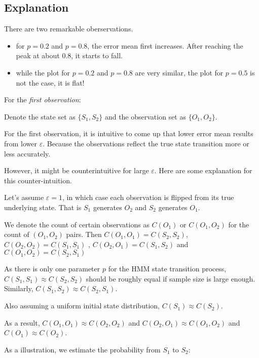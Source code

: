 \documentclass[paper=a4, fontsize=11pt]{scrartcl} %
\numberwithin{equation}{section} %
\numberwithin{figure}{section} %
\numberwithin{table}{section} %
\begin{document}
\subsection {Explanation}

There are two remarkable oberservations.

\begin{itemize}
\item for $p=0.2$ and $p=0.8$, the error mean first increases. After reaching the peak at about 0.8, it starts to fall.
\item while the plot for $p=0.2$ and $p=0.8$ are very similar, the plot for $p=0.5$ is not the case, it is flat!
\end {itemize}

For the {\em first observation}:\newline

Denote the state set as $\{S_1, S_2\}$ and the observation set as $\{O_1, O_2\}$. \newline

For the first observation, it is intuitive to come up that lower error mean results from lower $\varepsilon$. Because the observations reflect the true state transition more or less accurately. 

However, it might be counterintuitive for large $\varepsilon$. Here are some explanation for this counter-intuition. \newline

Let's assume $\varepsilon=1$, in which case each observation is flipped from its true underlying state. That is $S_1$ generates $O_2$ and $S_2$ generates $O_1$. 

We denote the count of certain observations as $C (O_1)$ or $C (O_1, O_2)$ for the count of $(O_1, O_2)$ pairs. Then $C (O_1, O_1) = C (S_2, S_2)$, $C (O_2, O_2) = C (S_1, S_1)$ , $C (O_2, O_1) = C (S_1, S_2)$ and $C (O_1, O_2) = C (S_2, S_1)$ 

As there is only one parameter $p$ for the HMM state transition process, $C(S_1,S_1) \approx C(S_2,S_2)$ should be roughly equal if sample size is large enough. Similarly, $C(S_1, S_2) \approx C(S_2, S_1)$. 

Also assuming a uniform initial state distribution, $C (S_1) \approx C (S_2)$. \newline

As a result, $C (O_1, O_1) \approx C (O_2, O_2)$ and $C (O_2, O_1) \approx C (O_1, O_2)$ and $C (O_1) \approx C (O_2)$. 

As a illustration, we estimate the probability from $S_1$ to $S_2$:
\end{document}
